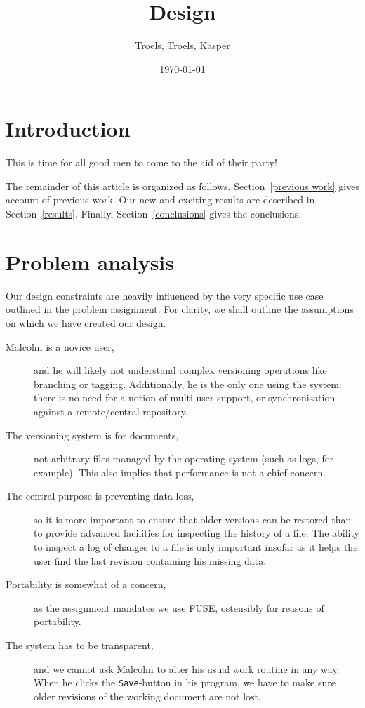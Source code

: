 \documentclass[12pt]{article}
\author{
        Troels, Troels, Kasper
}
\date{\today}
\title{Design}
\begin{document}
 
\maketitle
 
\section{Introduction}
This is time for all good men to come to the aid of their party!
 
 
The remainder of this article is organized as follows.
Section~\ref{previous work} gives account of previous work. Our new
and exciting results are described in Section~\ref{results}. Finally,
Section~\ref{conclusions} gives the conclusions.

\section{Problem analysis}

Our design constraints are heavily influenced by the very specific use
case outlined in the problem assignment.  For clarity, we shall
outline the assumptions on which we have created our design.

\begin{description}
\item[Malcolm is a novice user,] and he will likely not understand
  complex versioning operations like branching or tagging.
  Additionally, he is the only one using the system: there is no need
  for a notion of multi-user support, or synchronisation against a
  remote/central repository.
\item[The versioning system is for documents,] not arbitrary files
  managed by the operating system (such as logs, for example).  This
  also implies that performance is not a chief concern.
\item[The central purpose is preventing data loss,] so it is more
  important to ensure that older versions can be restored than to
  provide advanced facilities for inspecting the history of a file.
  The ability to inspect a log of changes to a file is only important
  insofar as it helps the user find the last revision containing his
  missing data.
\item[Portability is somewhat of a concern,] as the assignment
  mandates we use FUSE, ostensibly for reasons of portability.
\item[The system has to be transparent,] and we cannot ask Malcolm to
  alter his usual work routine in any way.  When he clicks the
  \texttt{Save}-button in his program, we have to make sure older
  revisions of the working document are not lost.
\end{description}
\end{document}
